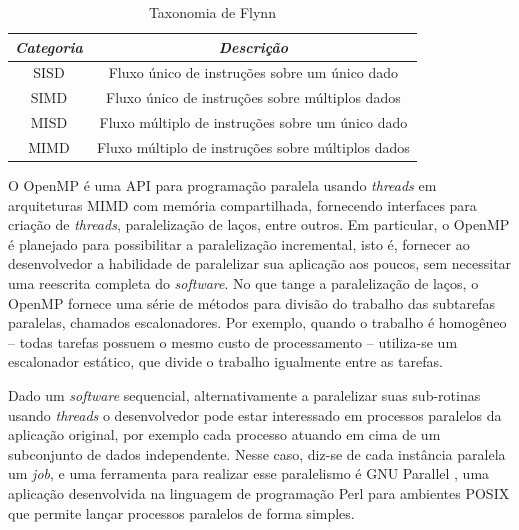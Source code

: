 \documentclass[cic,tc]{iiufrgs}
\begin{document}
\begin{table}[h]
    \caption{Taxonomia de Flynn}
    \centering
        \begin{tabular}{c|c}
          \hline
          \textit{Categoria}  &   \textit{Descrição} \\
          \hline
          \hline
          SISD & Fluxo único de instruções sobre um único dado \\
          SIMD & Fluxo único de instruções sobre múltiplos dados \\
          MISD & Fluxo múltiplo de instruções sobre um único dado \\
          MIMD & Fluxo múltiplo de instruções sobre múltiplos dados \\
          \hline
        \end{tabular}
    \label{tbl:flynn}
\end{table}

O OpenMP \cite{chandra2001parallel} é uma API para programação paralela usando \textit{threads} em
arquiteturas MIMD com memória compartilhada, fornecendo interfaces para criação
de \textit{threads}, paralelização de laços, entre outros. Em particular, o
OpenMP é planejado para possibilitar a paralelização incremental, isto é,
fornecer ao desenvolvedor a habilidade de paralelizar sua aplicação aos poucos,
sem necessitar uma reescrita completa do \textit{software}. No que tange a
paralelização de laços, o OpenMP fornece uma série de métodos para divisão do
trabalho das subtarefas paralelas, chamados escalonadores. Por exemplo, quando
o trabalho é homogêneo -- todas tarefas possuem o mesmo custo de processamento
-- utiliza-se um escalonador estático, que divide o trabalho igualmente entre
as tarefas.

Dado um \textit{software} sequencial, alternativamente a paralelizar suas
sub-rotinas usando \textit{threads} o desenvolvedor pode estar interessado em
processos paralelos da aplicação original, por exemplo cada processo atuando
em cima de um subconjunto de dados independente. Nesse caso, diz-se de cada
instância paralela um \textit{job}, e uma ferramenta para realizar esse
paralelismo é GNU Parallel \cite{tange_ole_2021_5233953}, uma aplicação
desenvolvida na linguagem de programação Perl para ambientes POSIX que permite
lançar processos paralelos de forma simples.
\end{document}
